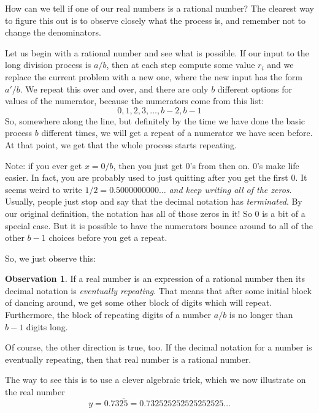 \documentclass[12pt,letterpaper]{article}
\theoremstyle{definition}
\newtheorem*{observation}{Observation}
\begin{document}
How can we tell if one of our real numbers is a rational number?
The clearest way to figure this out is to observe closely what the process is, and remember not to change the denominators.

Let us begin with a rational number and see what is possible.
If our input to the long division process is $a/b$, then at each step compute some value $r_i$ and we replace the current problem with a new one, where the new input has the form $a'/b$. 
We repeat this over and over, and there are only $b$ different options for values of the numerator, because the numerators come from this list:
\[
0, 1, 2, 3, \ldots, b-2, b-1
\]
So, somewhere along the line, but definitely by the time we have done the basic process $b$ different times, we will get a repeat of a numerator we have seen before.
At that point, we get that the whole process starts repeating.

Note: if you ever get $x = 0/b$, then you just get $0$'s from then on.
$0$'s make life easier.
In fact, you are probably used to just quitting after you get the first $0$.
It seems weird to write $1/2 = 0.5000000000\ldots$ \emph{and keep writing all of the zeros}.
Usually, people just stop and say that the decimal notation has \emph{terminated}.
By our original definition, the notation has all of those zeros in it!
So $0$ is a bit of a special case.
But it is possible to have the numerators bounce around to all of the other $b-1$ choices before you get a repeat.

So, we just observe this:

\begin{observation}
If a real number is an expression of a rational number then its decimal notation is \emph{eventually repeating}.
That means that after some initial block of dancing around, we get some other block of digits which will repeat.
Furthermore, the block of repeating digits of a number $a/b$ is no longer than $b-1$ digits long.
\end{observation}

Of course, the other direction is true, too. If the decimal notation for a number is eventually repeating, then that real number is a rational number.

The way to see this is to use a clever algebraic trick, which we now illustrate on the real number 
\[
y = 0.73\overline{25} = 0.732525252525252525\ldots
\]
\end{document}
